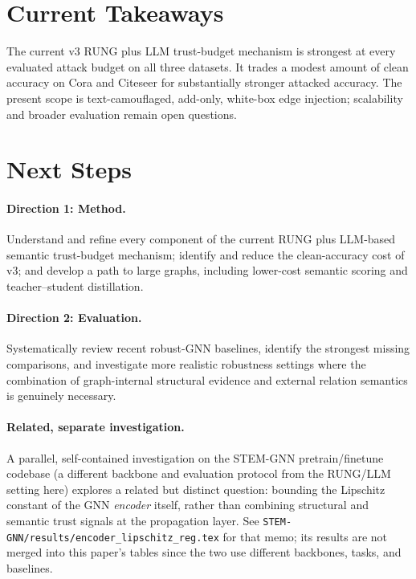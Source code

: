 \documentclass{article}
\begin{document}
\section{Current Takeaways}

The current v3 RUNG plus LLM trust-budget mechanism is strongest at every evaluated attack
budget on all three datasets. It trades a modest amount of clean accuracy on
Cora and Citeseer for substantially stronger attacked accuracy. The present
scope is text-camouflaged, add-only, white-box edge injection; scalability and
broader evaluation remain open questions.

\section{Next Steps}

\paragraph{Direction 1: Method.}
Understand and refine every component of the current RUNG plus LLM-based
semantic trust-budget mechanism; identify and reduce the clean-accuracy cost of v3; and
develop a path to large graphs, including lower-cost semantic scoring and
teacher--student distillation.

\paragraph{Direction 2: Evaluation.}
Systematically review recent robust-GNN baselines, identify the strongest
missing comparisons, and investigate more realistic robustness settings where
the combination of graph-internal structural evidence and external relation
semantics is genuinely necessary.

\paragraph{Related, separate investigation.}
A parallel, self-contained investigation on the STEM-GNN pretrain/finetune
codebase (a different backbone and evaluation protocol from the RUNG/LLM
setting here) explores a related but distinct question: bounding the
Lipschitz constant of the GNN \emph{encoder} itself, rather than combining
structural and semantic trust signals at the propagation layer. See
\texttt{STEM-GNN/results/encoder\_lipschitz\_reg.tex} for that memo; its
results are not merged into this paper's tables since the two use
different backbones, tasks, and baselines.
\end{document}
